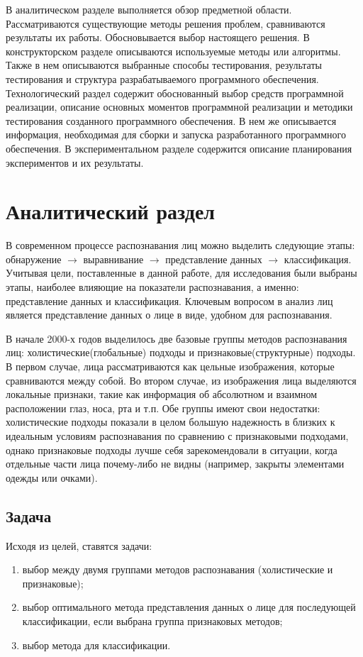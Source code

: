 \documentclass[a4paper,12pt]{report}
\numberwithin{equation}{section}
\begin{document}
В аналитическом разделе выполняется обзор предметной области. Рассматриваются
существующие методы решения проблем, сравниваются результаты их
работы. Обосновывается выбор настоящего решения. В конструкторском разделе
описываются используемые методы или алгоритмы. Также в нем описываются выбранные
способы тестирования, результаты тестирования и структура разрабатываемого
программного обеспечения. Технологический раздел содержит обоснованный выбор
средств программной реализации, описание основных моментов программной
реализации и методики тестирования созданного программного обеспечения. В нем же
описывается информация, необходимая для сборки и запуска разработанного
программного обеспечения. В экспериментальном разделе содержится описание
планирования экспериментов и их результаты.

\section{Аналитический раздел}
В современном процессе распознавания лиц можно выделить следующие этапы:
обнаружение $\to$ выравнивание $\to$ представление данных $\to$
классификация. Учитывая цели, поставленные в данной работе, для исследования
были выбраны этапы, наиболее влияющие на показатели распознавания, а именно:
представление данных и классификация. Ключевым вопросом в анализ лиц является
представление данных о лице в виде, удобном для распознавания.


В начале 2000-х годов выделилось две базовые группы методов распознавания лиц:
холистические(глобальные) подходы и признаковые(структурные) подходы. В первом
случае, лица рассматриваются как цельные изображения, которые сравниваются между
собой. Во втором случае, из изображения лица выделяются локальные признаки,
такие как информация об абсолютном и взаимном расположении глаз, носа, рта и
т.п. Обе группы имеют свои недостатки: холистические подходы показали в целом
большую надежность в близких к идеальным условиям распознавания по сравнению с
признаковыми подходами, однако признаковые подходы лучше себя зарекомендовали в
ситуации, когда отдельные части лица почему-либо не видны (например, закрыты
элементами одежды или очками).

\subsection{Задача} 
Исходя из целей, ставятся задачи:
\begin{enumerate}
\item выбор между двумя группами методов распознавания (холистические и
признаковые);
\item выбор оптимального метода представления данных о лице для последующей
классификации, если выбрана группа признаковых методов;
\item выбор метода для классификации.
\end{enumerate}
\end{document}
